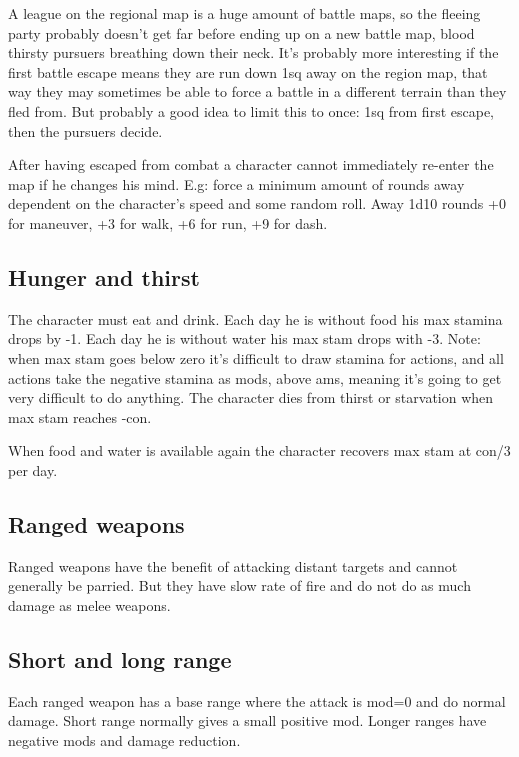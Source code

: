 A league on the regional map is a huge amount of battle maps, so the fleeing party probably doesn't get far before ending up on a new battle map, blood thirsty pursuers breathing down their neck. It's probably more interesting if the first battle escape means they are run down 1sq away on the region map, that way they may sometimes be able to force a battle in a different terrain than they fled from. But probably a good idea to limit this to once: 1sq from first escape, then the pursuers decide.

After having escaped from combat a character cannot immediately re-enter the map if he changes his mind. E.g: force a minimum amount of rounds away dependent on the character's speed and some random roll. Away 1d10 rounds +0 for maneuver, +3 for walk, +6 for run, +9 for dash.


\subsection*{Hunger and thirst}
The character must eat and drink. Each day he is without food his max stamina drops by -1. Each day he is without water his max stam drops with -3. Note: when max stam goes below zero it's difficult to draw stamina for actions, and all actions take the negative stamina as mods, above ams, meaning it's going to get very difficult to do anything.
The character dies from thirst or starvation when max stam reaches -con.

When food and water is available again the character recovers max stam at con/3 per day.










\subsection*{Ranged weapons}
Ranged weapons have the benefit of attacking distant targets and cannot generally be parried. But they have slow rate of fire and do not do as much damage as melee weapons.


\subsection*{Short and long range}
Each ranged weapon has a base range where the attack is mod=0 and do normal damage. Short range normally gives a small positive mod. Longer ranges have negative mods and damage reduction.


